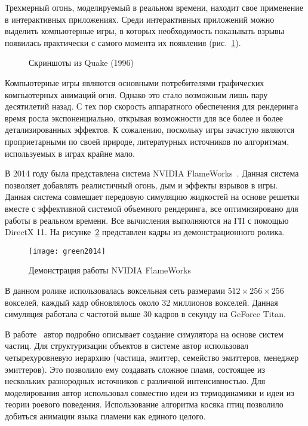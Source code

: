 Трехмерный огонь, моделируемый в реальном времени, находит свое применение в
интерактивных приложениях. Среди интерактивных приложений можно выделить
компьютерные игры, в которых необходимость показывать взрывы появилась
практически с самого момента их появления (рис.~\ref{fig:earlyGames}).
\begin{figure}[htb]
    \centering
    \qquad
    \caption{Скриншоты из Quake (1996)~\cite{capstone}}%
    \label{fig:earlyGames}%
\end{figure}
Компьютерные игры являются основными потребителями графических компьютерных
анимаций огня. Однако это стало возможным лишь пару десятилетий назад. С тех пор
скорость аппаратного обеспечения для рендеринга время росла экспоненциально,
открывая возможности для все более и более детализированных эффектов. К
сожалению, поскольку игры зачастую являются проприетарными по своей природе,
литературных источников по алгоритмам, используемых в играх крайне мало.

В 2014 году была представлена система NVIDIA
FlameWorks~\cite{Green:2014:NFR:2633956.2658828}. Данная система позволяет
добавлять реалистичный огонь, дым и эффекты взрывов в игры.  Данная система
совмещает передовую симуляцию жидкостей на основе решетки вместе с эффективной
системой объемного рендеринга, все оптимизировано для работы в реальном времени.
Все вычисления выполняются на ГП с помощью DirectX 11. На
рисунке~\ref{fig:FlameWorks} представлен кадры из демонстрационного ролика.
\begin{figure}[htb]
	\centering
	\texttt{[image: green2014]}
	\caption{Демонстрация работы NVIDIA FlameWorks}%
    \label{fig:FlameWorks}
\end{figure}
В данном ролике использовалась воксельная сеть размерами $512 \times 256 \times 256$
вокселей, каждый кадр обновлялось около 32 миллионов вокселей.
Данная симуляция работала с частотой выше 30 кадров в секунду на GeForce Titan.

В работе~\cite{Somasekaran2005UsingPS} автор подробно описывает создание
симулятора на основе систем частиц. Для структуризации объектов в системе автор
использовал четырехуровневую иерархию (частица, эмиттер, семейство эмиттеров,
менеджер эмиттеров). Это позволило ему создавать сложное пламя, состоящее из
нескольких разнородных источников с различной интенсивностью. Для моделирования
автор использовал совместно идеи из термодинамики и идеи из теории роевого
поведения. Использование алгоритма косяка птиц позволило добиться анимации языка
пламени как единого целого.


